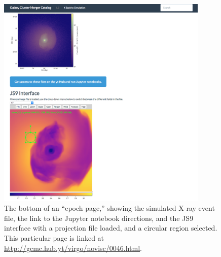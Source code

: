 \documentclass{emulateapj}
\begin{document}
\begin{figure}
\begin{center}
\includegraphics[width=0.9\textwidth]{epoch_page2.eps}
\caption{The bottom of an ``epoch page,'' showing the simulated X-ray event file, the link to the Jupyter notebook directions, and the JS9 interface with a projection file loaded, and a circular region selected. This particular page is linked at \url{http://gcmc.hub.yt/virgo/novisc/0046.html}.}
\end{center}
\end{figure}
\end{document}
